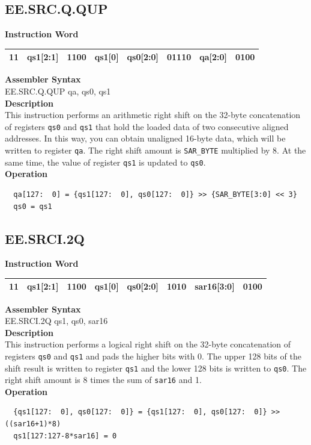 \clearpage
\subsection{EE.SRC.Q.QUP}\label{instruction:EESRCQQUP}
\setlength\tabcolsep{6pt}
\textbf{Instruction Word} \\
\begin{tabular}{|c|c|c|c|c|c|c|c|}
	\hline
	11 & qs1[2:1] & 1100 & qs1[0] & qs0[2:0] & 01110 & qa[2:0] & 0100 \\
	\hline
\end{tabular}

\textbf{Assembler Syntax} \\
EE.SRC.Q.QUP qa, qs0, qs1 \\
\textbf{Description} \\
This instruction performs an arithmetic right shift on the 32-byte concatenation of registers \lstinline{qs0} and \lstinline{qs1} that hold the loaded data of two consecutive aligned addresses. In this way, you can obtain unaligned 16-byte data, which will be written to register \lstinline{qa}. The right shift amount is \lstinline{SAR_BYTE} multiplied by 8. At the same time, the value of register \lstinline{qs1} is updated to \lstinline{qs0}.\\
\textbf{Operation}
\begin{lstlisting}
  qa[127:  0] = {qs1[127:  0], qs0[127:  0]} >> {SAR_BYTE[3:0] << 3}
  qs0 = qs1
\end{lstlisting}

\clearpage
\subsection{EE.SRCI.2Q}\label{instruction:EESRCI2Q}
\setlength\tabcolsep{6pt}
\textbf{Instruction Word} \\
\begin{tabular}{|c|c|c|c|c|c|c|c|}
	\hline
	11 & qs1[2:1] & 1100 & qs1[0] & qs0[2:0] & 1010 & sar16[3:0] & 0100 \\
	\hline
\end{tabular}

\textbf{Assembler Syntax} \\
EE.SRCI.2Q qs1, qs0, sar16 \\
\textbf{Description} \\
This instruction performs a logical right shift on the 32-byte concatenation of registers \lstinline{qs0} and \lstinline{qs1} and pads the higher bits with 0. The upper 128 bits of the shift result is written to register \lstinline{qs1} and the lower 128 bits is written to \lstinline{qs0}. The right shift amount is 8 times the sum of \lstinline{sar16} and 1.\\
\textbf{Operation}
\begin{lstlisting}
  {qs1[127:  0], qs0[127:  0]} = {qs1[127:  0], qs0[127:  0]} >> ((sar16+1)*8)
  qs1[127:127-8*sar16] = 0
\end{lstlisting}

